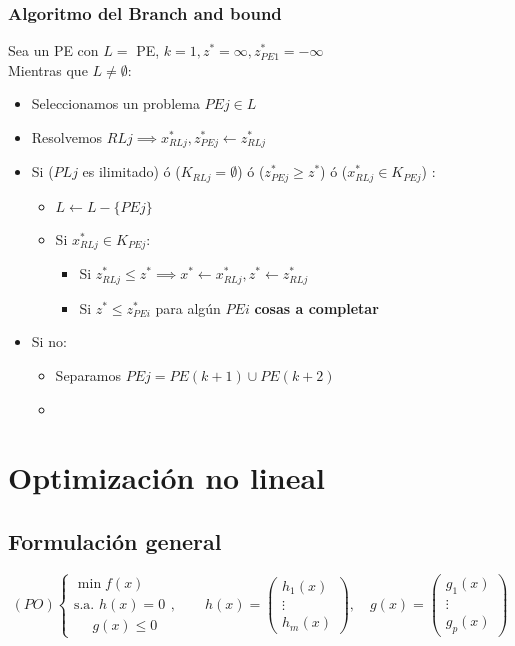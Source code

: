 \documentclass[leqno]{article}
\begin{document}
\subsubsection{Algoritmo del Branch and bound}
Sea un PE con $L =$ {PE}, $k=1, z^* = \infty, z_{PE1}^*=-\infty$ \\
Mientras que $L\neq \emptyset$:
\begin{itemize}
  \item Seleccionamos un problema $PEj\in L$
  \item Resolvemos  $RLj \implies x^*_{RLj}, z^*_{PEj}\leftarrow z^*_{RLj}$
  \item Si ($PLj$ es ilimitado)  ó  ($K_{RLj} = \emptyset $)  ó  ($z^*_{PEj} \ge  z^*$)  ó  ($x^*_{RLj}\in K_{PEj}$) :
	\begin{itemize}
	  \item $L \leftarrow L-\{PEj\}$
	  \item Si $x^*_{RLj}\in K_{PEj}$:
		\begin{itemize}
		  \item Si $z_{RLj}^* \le z^* \implies x^* \leftarrow x^*_{RLj}, z^* \leftarrow z^*_{RLj}$
		  \item Si $z^*\le z^*_{PEi}$ para algún $PEi$  \textbf{cosas a completar}
		\end{itemize}
	\end{itemize}
  \item Si no:
	\begin{itemize}
	  \item Separamos $PEj = PE(k+1)\cup PE(k+2)$
	  \item 
	\end{itemize}
\end{itemize}


\section{Optimización no lineal}
\subsection{Formulación general}
$$
(PO)
\begin{cases}
    \min f(x) \\
    \text{s.a. } h(x) = 0 \\
    \ \ \ \ \ \ g(x) \leq 0
\end{cases}, \qquad 
h(x) = \begin{pmatrix}
h_1(x) \\
\vdots \\
h_m(x)
\end{pmatrix}, \quad 
g(x) = \begin{pmatrix}
g_1(x) \\
\vdots \\
g_p(x)
\end{pmatrix}
$$
\end{document}
